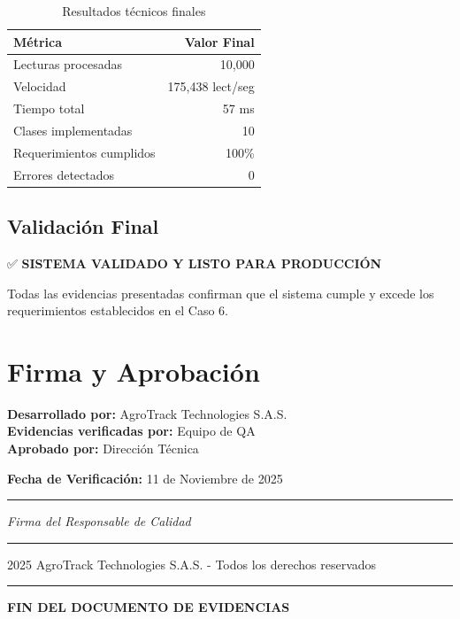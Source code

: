\documentclass[12pt,a4paper]{article}
\begin{document}
\begin{table}[h]
\centering
\begin{tabular}{|l|r|}
\hline
\rowcolor{agrogreen!20}
\textbf{Métrica} & \textbf{Valor Final} \\
\hline
Lecturas procesadas & 10,000 \\
Velocidad & 175,438 lect/seg \\
Tiempo total & 57 ms \\
Clases implementadas & 10 \\
Requerimientos cumplidos & 100\% \\
Errores detectados & 0 \\
\hline
\end{tabular}
\caption{Resultados técnicos finales}
\label{tab:resultados-finales}
\end{table}

\subsection{Validación Final}

✅ \textbf{SISTEMA VALIDADO Y LISTO PARA PRODUCCIÓN}

Todas las evidencias presentadas confirman que el sistema cumple y excede los requerimientos establecidos en el Caso 6.


\section*{Firma y Aprobación}

\vspace{1cm}

\noindent
\textbf{Desarrollado por:} AgroTrack Technologies S.A.S. \\
\textbf{Evidencias verificadas por:} Equipo de QA \\
\textbf{Aprobado por:} Dirección Técnica \\

\vspace{1cm}

\noindent
\textbf{Fecha de Verificación:} 11 de Noviembre de 2025

\vspace{2cm}

\begin{center}
\rule{6cm}{0.4pt}

\textit{Firma del Responsable de Calidad}
\end{center}

\vspace{2cm}

\begin{center}
\hrule
\vspace{0.3cm}
\textcopyright{} 2025 AgroTrack Technologies S.A.S. - Todos los derechos reservados
\vspace{0.3cm}
\hrule
\end{center}

\vfill

\begin{center}
\Large\textbf{FIN DEL DOCUMENTO DE EVIDENCIAS}
\end{center}
\end{document}
